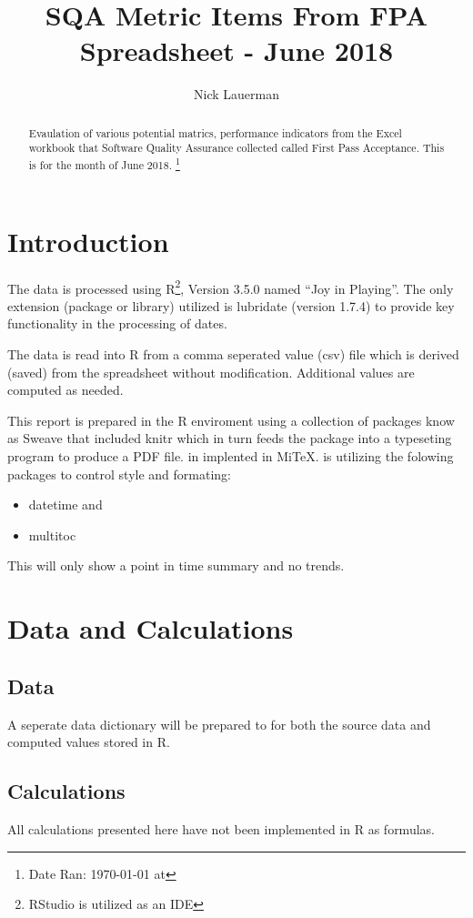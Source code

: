 \documentclass{article}
\title{SQA Metric Items From FPA Spreadsheet - June 2018}
\author{Nick Lauerman}
\date{}
\begin{document}

\maketitle

\begin{abstract}
Evaulation of various potential matrics, performance indicators from the Excel
workbook that Software Quality Assurance collected called First Pass
Acceptance. This is for the month of June 2018.
\footnote{Date Ran: \today{} at \currenttime}
\end{abstract}

\tableofcontents

\section{Introduction}
The data is processed using R\footnote{RStudio is utilized as an IDE}, Version
3.5.0 named ``Joy in Playing''. The only extension (package or library) utilized is
lubridate (version 1.7.4) to provide key functionality in the processing of dates.

The data is read into R from a comma seperated value (csv) file which is derived (saved)
from the spreadsheet without modification. Additional values are computed as needed.

This report is prepared in the R enviroment using a collection of packages know as
Sweave that included knitr which in turn feeds the package into \LaTeXe{} a typeseting
program to produce a PDF file. \LaTeXe{} in implented in Mi\TeX. \LaTeXe{} is utilizing
the folowing packages to control style and formating:
\begin{itemize}
\item datetime and
\item multitoc
\end{itemize}

This will only show a point in time summary and no trends.

\section{Data and Calculations}
\subsection{Data}
A seperate data dictionary will be prepared to for both the source data
and computed values stored in R.

\subsection{Calculations}
All calculations presented here have not been implemented in R as formulas.
\end{document}
